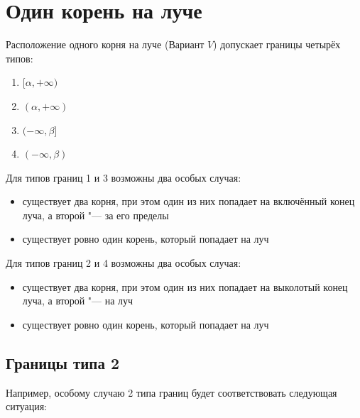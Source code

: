 \section {Один корень на луче}

Расположение одного корня на луче (Вариант $V$) допускает границы четырёх типов:

\begin {enumerate} [labelindent=\parindent, leftmargin=*]
    \item {$[\alpha, +\infty)$}
    \item {$(\alpha, +\infty)$}
    \item {$(-\infty, \beta]$}
    \item {$(-\infty, \beta)$}
\end {enumerate}

Для типов границ 1 и 3 возможны два особых случая:

\begin {itemize}
    \item {существует два корня, при этом один из них попадает на включённый конец луча, а
           второй "--- за его пределы}
    \item {существует ровно один корень, который попадает на луч }
\end {itemize}

Для типов границ 2 и 4 возможны два особых случая:

\begin {itemize}
    \item {существует два корня, при этом один из них попадает на выколотый конец луча, а
           второй "--- на луч}
    \item {существует ровно один корень, который попадает на луч }
\end {itemize}

\subsection {Границы типа 2}

Например, особому случаю 2 типа границ будет соответствовать следующая ситуация:

